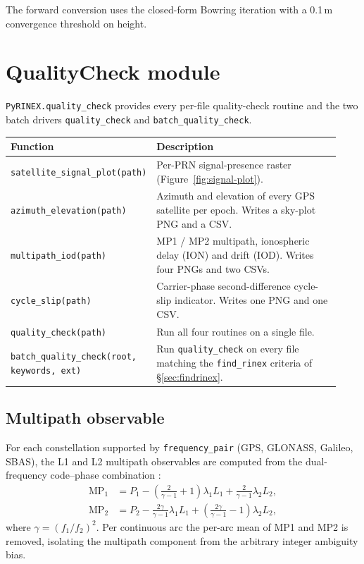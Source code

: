 \documentclass[11pt,a4paper]{article}
\begin{document}
\noindent
The forward conversion uses the closed-form Bowring iteration with a
0.1\,m convergence threshold on height.

\section{QualityCheck module}

\texttt{PyRINEX.quality\_check} provides every per-file quality-check
routine and the two batch drivers \texttt{quality\_check} and
\texttt{batch\_quality\_check}.

\begin{longtable}{p{0.34\linewidth}p{0.59\linewidth}}
\toprule
\textbf{Function} & \textbf{Description} \\
\midrule
\texttt{satellite\_signal\_plot(path)} & Per-PRN signal-presence
raster (Figure~\ref{fig:signal-plot}). \\
\addlinespace
\texttt{azimuth\_elevation(path)} & Azimuth and elevation of every GPS
satellite per epoch. Writes a sky-plot PNG and a CSV. \\
\addlinespace
\texttt{multipath\_iod(path)} & MP1 / MP2 multipath, ionospheric delay
(ION) and drift (IOD). Writes four PNGs and two CSVs. \\
\addlinespace
\texttt{cycle\_slip(path)} & Carrier-phase second-difference
cycle-slip indicator. Writes one PNG and one CSV. \\
\addlinespace
\texttt{quality\_check(path)} & Run all four routines on a single
file. \\
\addlinespace
\texttt{batch\_quality\_check(root, keywords, ext)} & Run
\texttt{quality\_check} on every file matching the
\texttt{find\_rinex} criteria of \S\ref{sec:findrinex}. \\
\bottomrule
\end{longtable}

\subsection{Multipath observable}

For each constellation supported by \texttt{frequency\_pair} (GPS,
GLONASS, Galileo, SBAS), the L1 and L2 multipath observables are
computed from the dual-frequency code--phase combination
\cite{estey1999teqc}:
\begin{align}
    \mathrm{MP_1}
    &= P_1 - \left(\frac{2}{\gamma - 1} + 1\right) \lambda_1 L_1
        + \frac{2}{\gamma - 1} \lambda_2 L_2, \\
    \mathrm{MP_2}
    &= P_2 - \frac{2\gamma}{\gamma - 1} \lambda_1 L_1
        + \left(\frac{2\gamma}{\gamma - 1} - 1\right) \lambda_2 L_2,
\end{align}
where $\gamma = (f_1 / f_2)^2$. Per continuous arc the per-arc mean
of MP1 and MP2 is removed, isolating the multipath component from the
arbitrary integer ambiguity bias.
\end{document}
